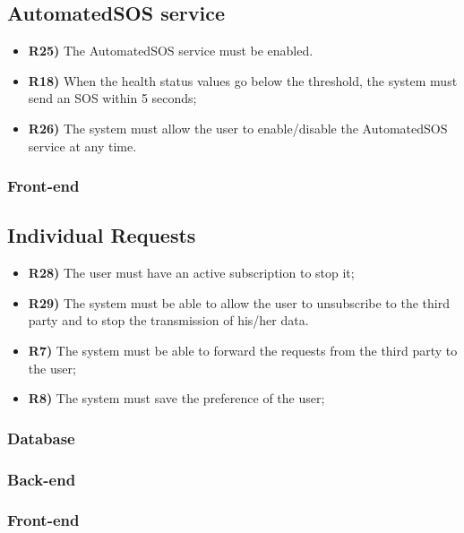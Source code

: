 \subsection{AutomatedSOS service}
\begin{itemize}	
	\item {\color{Green}\textbf{R25)}} The AutomatedSOS service must be enabled.
	\item {\color{Green}\textbf{R18)}} When the health status values go below the threshold, the system must send an SOS within 5 seconds;
	\item {\color{Green}\textbf{R26)}}	 The system must allow the user to enable/disable the AutomatedSOS service at any time.
\end{itemize}

\subsubsection*{Front-end}


\subsection{Individual Requests}
\begin{itemize}	
	\item {\color{Green}\textbf{R28)}} The user must have an active subscription to stop it;
	\item {\color{Green}\textbf{R29)}} The system must be able to allow the user to unsubscribe to the third party and to stop the transmission of his/her data.
	\item {\color{Green}\textbf{R7)}} The system must be able to forward the requests from the third party to the user;
	\item {\color{Green}\textbf{R8)}} The system must save the preference of the user;
	
\end{itemize}

\subsubsection*{Database}


\subsubsection*{Back-end}


\subsubsection*{Front-end}

